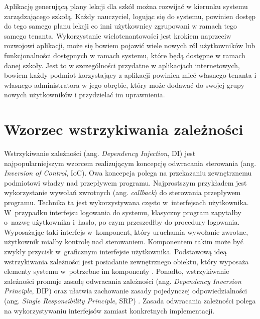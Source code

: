 \documentclass[a4paper]{book}
\newcommand{\obcy}[2]{{\selectlanguage{#1}#2}}
\newcommand{\ang}[1]{\emph{\obcy{british}{#1}}}
\begin{document}
{Aplikację generującą plany lekcji dla szkół można rozwijać w kierunku systemu zarządzającego szkołą. Każdy nauczyciel, logując się do systemu, powinien dostęp do tego samego planu lekcji co inni użytkownicy zgrupowani w ramach tego samego tenanta. Wykorzystanie wielotenantowości jest krokiem naprzeciw rozwojowi aplikacji, może się bowiem pojawić wiele nowych ról użytkowników lub funkcjonalności dostępnych w ramach systemu, które będą dostępne w ramach danej szkoły. Jest to w szczególności przydatne w aplikacjach internetowych, bowiem każdy podmiot korzystający z aplikacji powinien mieć własnego tenanta i własnego administratora w jego obrębie, który może dodawać do swojej grupy nowych użytkowników i przydzielać im uprawnienia.
 
\section{Wzorzec wstrzykiwania zależności}
Wstrzykiwanie zależności (ang. \ang{Dependency Injection}, DI) jest najpopularniejszym wzorcem realizującym koncepcję odwracania sterowania (ang. \ang{Inversion of Control}, IoC). Owa koncepcja polega na przekazaniu zewnętrznemu podmiotowi władzy nad przepływem programu. Najprostszym przykładem jest wykorzystanie wywołań zwrotnych (ang. \ang{callback}) do sterowania przepływem programu. Technika ta jest wykorzystywana często w~interfejsach użytkownika. W~przypadku interfejsu logowania do systemu, klasyczny program zapytałby o~nazwę użytkownika i~hasło, po czym przeszedłby do procedury logowania. Wyposażając taki interfejs w~komponent, który uruchamia wywołanie zwrotne, użytkownik miałby kontrolę nad sterowaniem. Komponentem takim może być zwykły przycisk w~graficznym interfejsie użytkownika. Podstawową ideą wstrzykiwania zależności jest posiadanie zewnętrznego obiektu, który wyposaża elementy systemu w~potrzebne im komponenty \cite{id:IOC_DI_Fowler}. Ponadto, wstrzykiwanie zależności promuje zasadę odwracania zależności (ang. \ang{Dependency Inversion Principle}, DIP) oraz ułatwia zachowanie zasady pojedynczej odpowiedzialności (ang. \ang{Single Responsibility Principle}, SRP) \cite{id:CleanCode}. Zasada odwracania zależności polega na wykorzystywaniu interfejsów zamiast konkretnych implementacji.

}
\end{document}
